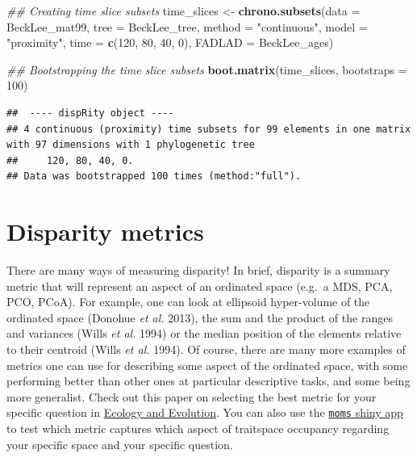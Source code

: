 \documentclass[
]{book}
\newenvironment{Shaded}{\begin{snugshade}}{\end{snugshade}}
\newcommand{\CommentTok}[1]{\textcolor[rgb]{0.56,0.35,0.01}{\textit{#1}}}
\newcommand{\DataTypeTok}[1]{\textcolor[rgb]{0.13,0.29,0.53}{#1}}
\newcommand{\DecValTok}[1]{\textcolor[rgb]{0.00,0.00,0.81}{#1}}
\newcommand{\KeywordTok}[1]{\textcolor[rgb]{0.13,0.29,0.53}{\textbf{#1}}}
\newcommand{\NormalTok}[1]{#1}
\newcommand{\StringTok}[1]{\textcolor[rgb]{0.31,0.60,0.02}{#1}}
\begin{document}
\begin{Shaded}
\begin{Highlighting}[]
\CommentTok{\#\# Creating time slice subsets}
\NormalTok{time\_slices \textless{}{-}}\StringTok{ }\KeywordTok{chrono.subsets}\NormalTok{(}\DataTypeTok{data =}\NormalTok{ BeckLee\_mat99,}
                              \DataTypeTok{tree =}\NormalTok{ BeckLee\_tree, }
                              \DataTypeTok{method =} \StringTok{"continuous"}\NormalTok{,}
                              \DataTypeTok{model =} \StringTok{"proximity"}\NormalTok{, }
                              \DataTypeTok{time =} \KeywordTok{c}\NormalTok{(}\DecValTok{120}\NormalTok{, }\DecValTok{80}\NormalTok{, }\DecValTok{40}\NormalTok{, }\DecValTok{0}\NormalTok{),}
                              \DataTypeTok{FADLAD =}\NormalTok{ BeckLee\_ages)}

\CommentTok{\#\# Bootstrapping the time slice subsets}
\KeywordTok{boot.matrix}\NormalTok{(time\_slices, }\DataTypeTok{bootstraps =} \DecValTok{100}\NormalTok{)}
\end{Highlighting}
\end{Shaded}

\begin{verbatim}
##  ---- dispRity object ---- 
## 4 continuous (proximity) time subsets for 99 elements in one matrix with 97 dimensions with 1 phylogenetic tree
##     120, 80, 40, 0.
## Data was bootstrapped 100 times (method:"full").
\end{verbatim}

\hypertarget{disparity-metrics}{%
\section{Disparity metrics}\label{disparity-metrics}}

There are many ways of measuring disparity!
In brief, disparity is a summary metric that will represent an aspect of an ordinated space (e.g.~a MDS, PCA, PCO, PCoA).
For example, one can look at ellipsoid hyper-volume of the ordinated space (Donohue \emph{et al.} 2013), the sum and the product of the ranges and variances (Wills \emph{et al.} 1994) or the median position of the elements relative to their centroid (Wills \emph{et al.} 1994).
Of course, there are many more examples of metrics one can use for describing some aspect of the ordinated space, with some performing better than other ones at particular descriptive tasks, and some being more generalist.
Check out this paper on selecting the best metric for your specific question in \href{https://onlinelibrary.wiley.com/doi/full/10.1002/ece3.6452}{Ecology and Evolution}.
You can also use the \href{https://tguillerme.shinyapps.io/moms/}{\texttt{moms} shiny app} to test which metric captures which aspect of traitspace occupancy regarding your specific space and your specific question.
\end{document}
